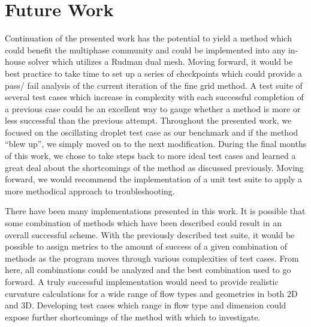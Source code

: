 \section{Future Work}
Continuation of the presented work has the potential to yield a method which could benefit the multiphase community and could be implemented into any in-house solver which utilizes a Rudman dual mesh. Moving forward, it would be best practice to take time to set up a series of checkpoints which could provide a pass/ fail analysis of the current iteration of the fine grid method. A test suite of several test cases which increase in complexity with each successful completion of a previous case could be an excellent way to gauge whether a method is more or less successful than the previous attempt. Throughout the presented work, we focused on the oscillating droplet test case as our benchmark and if the method ``blew up'', we simply moved on to the next modification. During the final months of this work, we chose to take steps back to more ideal test cases and learned a great deal about the shortcomings of the method as discussed previously. Moving forward, we would recommend the implementation of a unit test suite to apply a more methodical approach to troubleshooting.

There have been many implementations presented in this work. It is possible that some combination of methods which have been described could result in an overall successful scheme. With the previously described test suite, it would be possible to assign metrics to the amount of success of a given combination of methods as the program moves through various complexities of test cases. From here, all combinations could be analyzed and the best combination used to go forward. A truly successful implementation would need to provide realistic curvature calculations for a wide range of flow types and geometries in both 2D and 3D. Developing test cases which range in flow type and dimension could expose further shortcomings of the method with which to investigate.  

